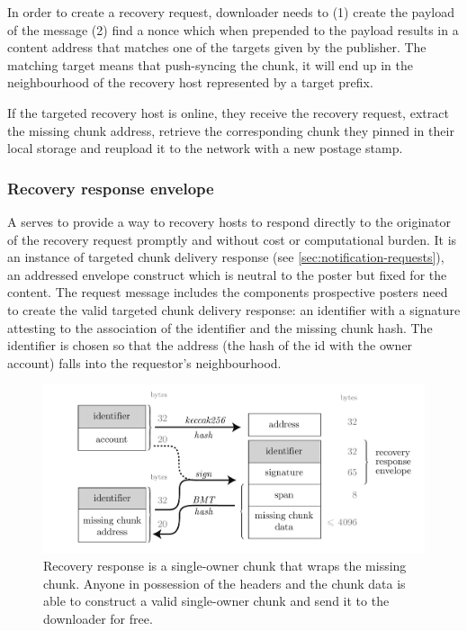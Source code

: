 In order to create a recovery request, downloader needs to (1) create the payload of the message (2) find a nonce which when prepended to the payload results in a content address that matches one of the targets given by the publisher. The matching target means that push-syncing the chunk, it will end up in the neighbourhood of the recovery host represented by a target prefix. 

If the targeted recovery host is online, they receive the recovery request, extract the missing chunk address, retrieve the corresponding chunk they pinned in their local storage and reupload it to the network with a new postage stamp.

\subsubsection{Recovery response envelope}

A  serves to provide a way to recovery hosts to  respond directly to the originator of the recovery request promptly and without cost or computational burden. It is an instance of targeted chunk delivery response (see \ref{sec:notification-requests}), an addressed envelope construct which is neutral to the poster but fixed for the content. The request message includes the components prospective posters need to create the valid targeted chunk delivery response: an identifier with a signature attesting to the association of the identifier and the missing chunk hash. The identifier is chosen so that the address (the hash of the id with the owner account) falls into the requestor's neighbourhood.

\begin{figure}[htbp]
\centering
\includegraphics[width=\textwidth]{fig/recovery-response-2.pdf}
\caption[Recovery response \statusgreen]{Recovery response is a single-owner chunk that wraps the missing chunk. Anyone in possession of the headers and the chunk data is able to construct a valid single-owner chunk and send it to the downloader for free.}
\label{fig:recovery-response}
\end{figure}

